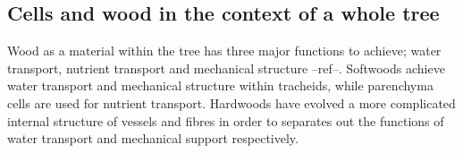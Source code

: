 \subsection{Cells and wood in the context of a whole tree}
Wood as a material within the tree has three major functions to achieve; water
transport, nutrient transport and mechanical structure --ref--. Softwoods
achieve water transport and mechanical structure within tracheids, while
parenchyma cells are used for nutrient transport. Hardwoods have evolved a more
complicated internal structure of vessels and fibres in order to separates out
the functions of water transport and mechanical support respectively.